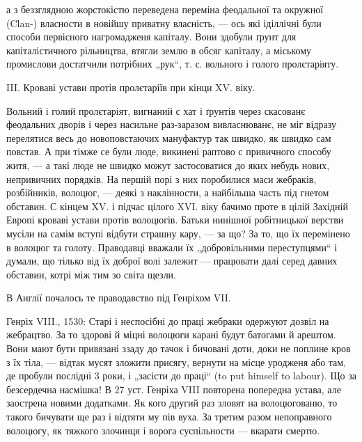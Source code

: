 \parcont{}
а з беззглядною жорстокістю переведена переміна феодальної та окружної (Clan-) власности в новійшу
приватну власність, — ось які іділлічні були способи первісного нагромадженя капіталу. Вони здобули
ґрунт для капіталістичного рільництва, втягли землю в обсяг капіталу, а міському промислови
достатчили потрібних „рук“, т. є. вольного і голого пролєтаріяту.

III.   Кроваві устави протів пролєтаріїв при кінци XV. віку.

Вольний і голий пролєтаріят, вигнаний с хат і ґрунтів через скасованє феодальних дворів і через
насильне раз-заразом вивласнюванє, не міг відразу перелятися весь до
новоповстаючих мануфактур так швидко, як швидко сам повстав. А при тімже се були люде, викинені
раптово с привичного способу житя, — а такі люде не швидко можут
застосоватися до яких небудь нових, непривичних порядків. На першій порі з них поробилися маси
жебраків, розбійників, волоцюг, — деякі з наклінности, а найбільша часть під гнетом обставин. С
кінцем XV. і підчас цілого XVI. віку бачимо проте в цілій Західній Европі кроваві устави протів
волоцюгів. Батьки нинішної робітницької верстви мусіли на самім вступі відбути страшну кару, — за
що? За то, що їх перемінено в волоцюг та голоту. Праводавці вважали їх „добровільними переступцями“
і думали, що тілько від їх доброї волі залежит — працювати далі серед давних обставин, котрі між тим
зо світа щезли.

В Англії почалось те праводавство під Генріхом VII.

Генріх VIII., 1530: Старі і неспосібні до праці жебраки одержуют дозвіл на жебрацтво. За то здорові
й міцні волоцюги карані будут батогами й арештом. Вони мают бути привязані ззаду до тачок і бичовані
доти, доки не поплине кров з їх тіла, — відтак мусят зложити присягу, вернути на місце уродженя або
там, де пробули послідні 3 роки, і „засісти до праці“ (to put himself to labour). Що за безсердечна
насмішка! В 27 уст. Генріха VIII повторена попередна устава, але заострена новими додатками. Як кого
другий раз зловят на волоцюгованю, то такого бичувати ще раз і відтяти му пів вуха. За третим разом
непоправного волоцюгу, як тяжкого злочинця і ворога суспільности —
вкарати смертю.

